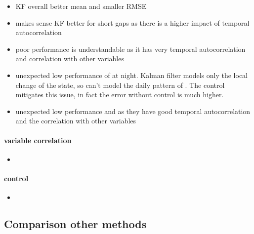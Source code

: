 \documentclass{article}
\let\Oldsubsection\subsection
\renewcommand{\subsection}{\FloatBarrier\Oldsubsection}
\begin{document}
\begin{itemize}
    \item KF overall better mean and smaller RMSE
    \item makes sense KF better for short gaps as there is a higher impact of temporal autocorrelation
    \item poor performance  is understandable as it has very temporal autocorrelation and correlation with other variables
    \item unexpected low performance of  at night. Kalman filter models only the local change of the state, so can't model the daily pattern of . The control mitigates this issue, in fact the error without control is much higher.
    \item unexpected low performance  and  as they have good temporal autocorrelation and the correlation with other variables 
\end{itemize}


\paragraph{variable correlation}

\begin{itemize}
    \item 
\end{itemize}

\paragraph{control}

\begin{itemize}
    \item 
\end{itemize}
\subsection{Comparison other methods}

\end{document}
